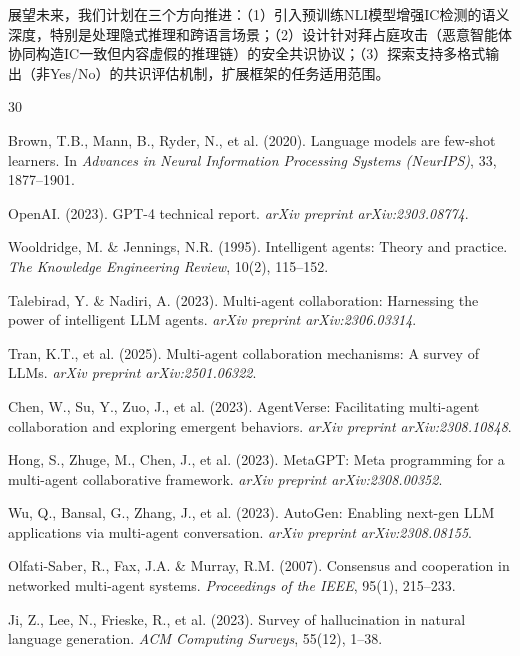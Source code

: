 \documentclass[12pt,a4paper,UTF8,fontset=fandol]{ctexart}
\begin{document}
展望未来，我们计划在三个方向推进：（1）引入预训练NLI模型增强IC检测的语义深度，特别是处理隐式推理和跨语言场景；（2）设计针对拜占庭攻击（恶意智能体协同构造IC一致但内容虚假的推理链）的安全共识协议；（3）探索支持多格式输出（非Yes/No）的共识评估机制，扩展框架的任务适用范围。

\begin{thebibliography}{30}

Brown, T.B., Mann, B., Ryder, N., et al. (2020). Language models are few-shot learners. In \textit{Advances in Neural Information Processing Systems (NeurIPS)}, 33, 1877--1901.

OpenAI. (2023). GPT-4 technical report. \textit{arXiv preprint arXiv:2303.08774}.

Wooldridge, M. \& Jennings, N.R. (1995). Intelligent agents: Theory and practice. \textit{The Knowledge Engineering Review}, 10(2), 115--152.

Talebirad, Y. \& Nadiri, A. (2023). Multi-agent collaboration: Harnessing the power of intelligent LLM agents. \textit{arXiv preprint arXiv:2306.03314}.

Tran, K.T., et al. (2025). Multi-agent collaboration mechanisms: A survey of LLMs. \textit{arXiv preprint arXiv:2501.06322}.

Chen, W., Su, Y., Zuo, J., et al. (2023). AgentVerse: Facilitating multi-agent collaboration and exploring emergent behaviors. \textit{arXiv preprint arXiv:2308.10848}.

Hong, S., Zhuge, M., Chen, J., et al. (2023). MetaGPT: Meta programming for a multi-agent collaborative framework. \textit{arXiv preprint arXiv:2308.00352}.

Wu, Q., Bansal, G., Zhang, J., et al. (2023). AutoGen: Enabling next-gen LLM applications via multi-agent conversation. \textit{arXiv preprint arXiv:2308.08155}.

Olfati-Saber, R., Fax, J.A. \& Murray, R.M. (2007). Consensus and cooperation in networked multi-agent systems. \textit{Proceedings of the IEEE}, 95(1), 215--233.

Ji, Z., Lee, N., Frieske, R., et al. (2023). Survey of hallucination in natural language generation. \textit{ACM Computing Surveys}, 55(12), 1--38.


\end{thebibliography}
\end{document}
